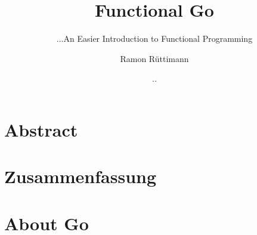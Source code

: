 \documentclass[%
  a4paper,
  twoside,
  numbers=noenddot,
  parskip=half,
  open=any,
  headsepline,
  english, %
  ba  %
]{zhawthesis}
\title{Functional Go}
\subtitle{...An Easier Introduction to Functional Programming}
\author{%
    Ramon Rüttimann
}
\date{\twodigits{\the\day}.\twodigits{\number\month}.\the\year}
\begin{document}
\frontmatter

\maketitle

\cleardoublepage %



\makedeclarationoforiginality %


\cleardoublepage %




\chapter{Abstract}
\label{ch:abstract} %


\chapter{Zusammenfassung}
\label{ch:summary} %


\label{ch:preface} %


\cleardoublepage %


\mainmatter %

\tableofcontents

\label{ch:introduction} %


\chapter{About Go}
\label{ch:about-go}

\end{document}
